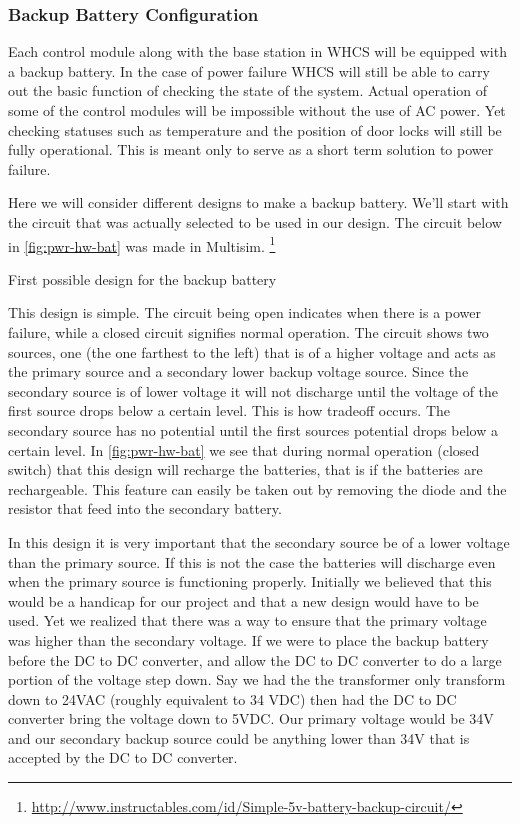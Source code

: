 \subsubsection{Backup Battery Configuration}
Each control module along with the base station in WHCS will be equipped with a
backup battery. In the case of power failure WHCS will still be able to carry
out the basic function of checking the state of the system. Actual operation of
some of the control modules will be impossible without the use of AC power. Yet
checking statuses such as temperature and the position of door locks will still
be fully operational. This is meant only to serve as a short term solution to
power failure.

Here we will consider different designs to make a backup battery. We{}'ll start
with the circuit that was actually selected to be used in our design. The
circuit below in \autoref{fig:pwr-hw-bat} was made in Multisim.
\footnote{\url{http://www.instructables.com/id/Simple-5v-battery-backup-circuit/}}

{First possible design for the backup battery}

This design is simple. The circuit being open indicates when there is a power
failure, while a closed circuit signifies normal operation. The circuit shows
two sources, one (the one farthest to the left) that is of a higher voltage and
acts as the primary source and a secondary lower backup voltage source. Since
the secondary source is of lower voltage it will not discharge until the
voltage of the first source drops below a certain level. This is how tradeoff
occurs.  The secondary source has no potential until the first sources
potential drops below a certain level. In \autoref{fig:pwr-hw-bat} we see that
during normal operation (closed switch) that this design will recharge the
batteries, that is if the batteries are rechargeable. This feature can easily
be taken out by removing the diode and the resistor that feed into the
secondary battery.

In this design it is very important that the secondary source be of a lower
voltage than the primary source. If this is not the case the batteries will
discharge even when the primary source is functioning properly. Initially we
believed that this would be a handicap for our project and that a new design
would have to be used. Yet we realized that there was a way to ensure that the
primary voltage was higher than the secondary voltage. If we were to place the
backup battery before the DC to DC converter, and allow the DC to DC converter
to do a large portion of the voltage step down.  Say we had the the transformer
only transform down to 24VAC (roughly equivalent to 34 VDC) then had the DC to
DC converter bring the voltage down to 5VDC. Our primary voltage would be 34V
and our secondary backup source could be anything lower than 34V that is
accepted by the DC to DC converter.

